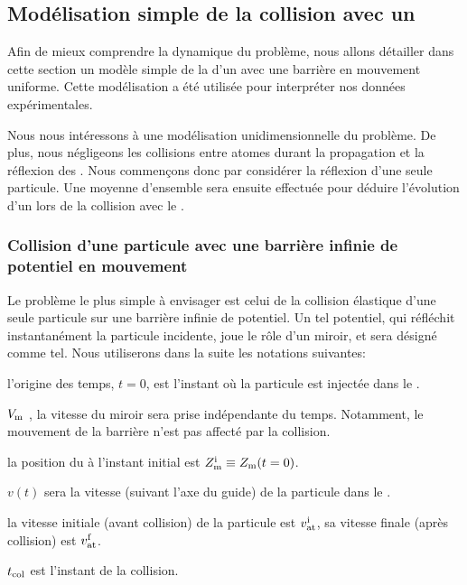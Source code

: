 \subsection{Modélisation simple de la collision avec un \mimo}
Afin de mieux comprendre la dynamique du problème, nous allons détailler dans cette section un modèle simple de la \colel d'un \pat avec une barrière en mouvement uniforme. Cette modélisation a été utilisée pour interpréter nos données expérimentales.%

Nous nous intéressons à une modélisation unidimensionnelle du problème. De plus, nous négligeons les collisions entre atomes durant la propagation et la réflexion des \pats. Nous commençons donc par considérer la réflexion d'une seule particule. Une moyenne d'ensemble sera ensuite effectuée pour déduire l'évolution d'un \pat lors de la collision avec le \mimo.

\subsubsection{Collision d'une particule avec une barrière infinie de potentiel en mouvement}

Le problème le plus simple à envisager est celui de la collision élastique d'une seule particule sur une barrière infinie de potentiel. Un tel potentiel, qui réfléchit instantanément la particule incidente, joue le rôle d'un miroir, et sera désigné comme tel.
Nous utiliserons dans la suite les notations suivantes:
\begin{itemizel}
	\item l'origine des temps, $t=0$, est l'instant où la particule est injectée dans le \gm.
	\item $V_{\rm {m}}$%
%
	, la vitesse du miroir sera prise indépendante du temps. Notamment, le mouvement de la barrière n'est pas affecté par la collision.
	\item la position du \mimo à l'instant initial est $Z_{\mathrm {m}}^{\mathrm i} \equiv Z_{\mathrm {m}}(t=0)$.%
% 
	\item $v(t)$ sera la vitesse (suivant l'axe du guide) de la particule dans le .
	\item la vitesse initiale (avant collision) de la particule est ${v_{\mathrm {at}}^{\rm i}}$, sa vitesse finale (après collision) est ${v_{\mathrm {at}}^{\rm f}}$.
	\item $t_{\mathrm {col}}$ est l'instant de la collision.%
%
%
\end{itemizel}

